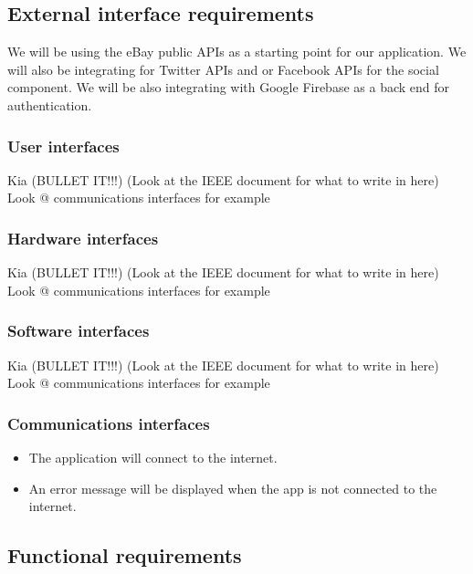 \documentclass[onecolumn, draftclsnofoot,10pt, compsoc]{IEEEtran}
\begin{document}
\subsection{External interface requirements}
We will be using the eBay public APIs as a starting point for our application. We will also be integrating for Twitter APIs and or Facebook APIs for the social component. We will be also integrating with Google Firebase as a back end for authentication. 

\subsubsection{User interfaces}
Kia (BULLET IT!!!) (Look at the IEEE document for what to write in here)
Look @ communications interfaces for example

\subsubsection{Hardware interfaces}
Kia (BULLET IT!!!) (Look at the IEEE document for what to write in here)
Look @ communications interfaces for example

\subsubsection{Software interfaces}
Kia (BULLET IT!!!) (Look at the IEEE document for what to write in here)
Look @ communications interfaces for example

\subsubsection{Communications interfaces}
\begin{itemize}
\item The application will connect to the internet.
\item An error message will be displayed when the app is not connected to the internet.
\end{itemize}
\subsection{Functional requirements}
\end{document}

